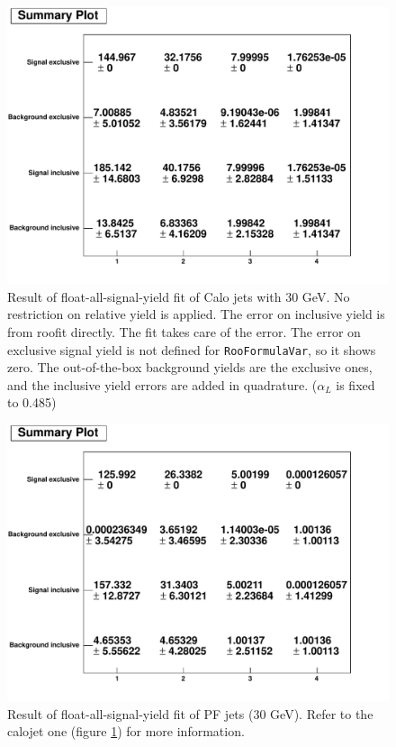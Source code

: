 \begin{figure}
\includegraphics[width=120mm]{DailyLog/6272/6272_FitSummaryPlot_FloatAll_Calo.pdf}
\caption{Result of float-all-signal-yield fit of Calo jets with 30 GeV.  No restriction on relative yield is applied.  The error on inclusive yield is from roofit directly.  The fit takes care of the error.
The error on exclusive signal yield is not defined for \texttt{RooFormulaVar}, so it shows zero.  The out-of-the-box background yields are the exclusive ones, and the inclusive yield errors
are added in quadrature.  ($\alpha_L$ is fixed to 0.485)}
\label{Figure_6272FitSummaryPlotFloatAllCalo}
\end{figure}

\begin{figure}
\includegraphics[width=120mm]{DailyLog/6272/6272_FitSummaryPlot_FloatAll_PF.pdf}
\caption{Result of float-all-signal-yield fit of PF jets (30 GeV).  Refer to the calojet one (figure \ref{Figure_6272FitSummaryPlotFloatAllCalo})
for more information.}
\label{Figure_6272FitSummaryPlotFloatAllPF}
\end{figure}

